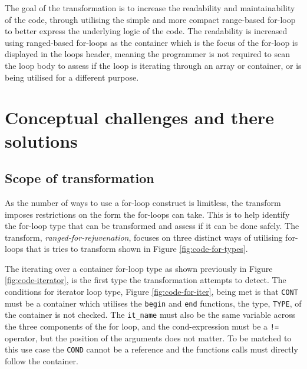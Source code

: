 \documentclass[bsc,frontabs,singlespacing,twoside,parskip,deptreport]{infthesis}
\begin{document}
The goal of the transformation is to increase the readability and maintainability of the code, through utilising the simple and more compact range-based for-loop to better express the underlying logic of the code. The readability is increased using ranged-based for-loops as the container which is the focus of the for-loop is displayed in the loops header, meaning the programmer is not required to scan the loop body to assess if the loop is iterating through an array or container, or is being utilised for a different purpose.



\section{Conceptual challenges and there solutions}\label{sec:for-concept}

\subsection{Scope of transformation}\label{sec:forLoop-scope-trans}

As the number of ways to use a for-loop construct is limitless, the transform imposes restrictions on the form the for-loops can take. This is to help identify the for-loop type that can be transformed and assess if it can be done safely. The transform, \textit{ranged-for-rejuvenation}, focuses on three distinct ways of utilising for-loops that is tries to transform shown in Figure \ref{fig:code-for-types}. 

The iterating over a container for-loop type as shown previously in Figure \ref{fig:code-iterator}, is the first type the transformation attempts to detect.
The conditions for iterator loop type, Figure \ref{fig:code-for-iter}, being met is that \texttt{CONT} must be a container which utilises the \texttt{begin} and \texttt{end} functions, the type, \texttt{TYPE}, of the container is not checked. The \texttt{it\_name} must also be the same variable across the three components of the for loop, and the cond-expression must be a \texttt{!=} operator, but the position of the arguments does not matter. To be matched to this use case the \texttt{COND} cannot be a reference and the functions calls must directly follow the container. 
\end{document}
